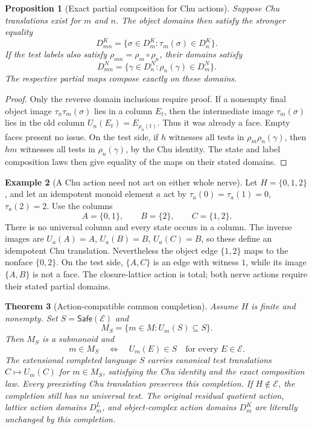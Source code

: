 \documentclass[11pt]{article}
\newtheorem{theorem}{Theorem}[section]
\newtheorem{proposition}[theorem]{Proposition}
\theoremstyle{definition}
\newtheorem{example}[theorem]{Example}
\newcommand{\Safe}{\mathsf{Safe}}
\begin{document}
\begin{proposition}[Exact partial composition for Chu actions]
Suppose Chu translations exist for $m$ and $n$. The object domains then
satisfy the stronger equality
\[
 D_{mn}^K=\{\sigma\in D_m^K:\tau_m(\sigma)\in D_n^K\}.
\]
If the test labels also satisfy $\rho_{mn}=\rho_m\circ\rho_n$, their
domains satisfy
\[
 D_{mn}^N=\{\gamma\in D_n^N:\rho_n(\gamma)\in D_m^N\}.
\]
The respective partial maps compose exactly on these domains.
\end{proposition}
\begin{proof}
Only the reverse domain inclusions require proof. If a nonempty final
object image $\tau_n\tau_m(\sigma)$ lies in a column $E_t$, then the
intermediate image $\tau_m(\sigma)$ lies in the old column
$U_n(E_t)=E_{\rho_n(t)}$. Thus it was already a face. Empty faces present
no issue. On the test side, if $h$ witnesses all tests in
$\rho_m\rho_n(\gamma)$, then $hm$ witnesses all tests in
$\rho_n(\gamma)$, by the Chu identity. The state and label composition
laws then give equality of the maps on their stated domains.
\end{proof}

\begin{example}[A Chu action need not act on either whole nerve]
Let $H=\{0,1,2\}$, and let an idempotent monoid element $a$ act by
$\tau_a(0)=\tau_a(1)=0$, $\tau_a(2)=2$. Use the columns
\[
 A=\{0,1\},\qquad B=\{2\},\qquad C=\{1,2\}.
\]
There is no universal column and every state occurs in a column.
The inverse images are $U_a(A)=A$, $U_a(B)=B$, $U_a(C)=B$, so these
define an idempotent Chu translation. Nevertheless the object edge
$\{1,2\}$ maps to the nonface $\{0,2\}$. On the test side,
$\{A,C\}$ is an edge with witness $1$, while its image $\{A,B\}$ is
not a face. The closure-lattice action is total; both nerve actions require
their stated partial domains.
\end{example}

\begin{theorem}[Action-compatible common completion]\label{thm:safeaction}
Assume $H$ is finite and nonempty. Set $S=\Safe(\mathcal E)$ and
\[
 M_S=\{m\in M:U_m(S)\subseteq S\}.
\]
Then $M_S$ is a submonoid and
\[
 m\in M_S\quad\Longleftrightarrow\quad
 U_m(E)\in S\quad\text{for every }E\in\mathcal E.
\]
The extensional completed language $S$ carries canonical test translations
$C\mapsto U_m(C)$ for $m\in M_S$, satisfying the Chu identity and the
exact composition law. Every preexisting Chu translation preserves this
completion. If $H\notin\mathcal E$, the completion still has no universal
test. The original residual quotient action, lattice action domains
$D_m^L$, and object-complex action domains $D_m^K$ are literally unchanged
by this completion.
\end{theorem}
\end{document}

